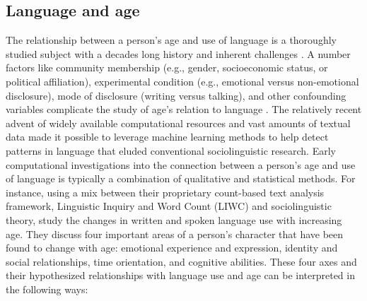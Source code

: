 \subsection{Language and age}
The relationship between a person's age and use of language is a thoroughly studied subject with a decades long history and inherent challenges \citep{pennebaker2003words, nguyen2014gender, zheng2019personalized}. A number factors like community membership (e.g., gender, socioeconomic status, or political affiliation), experimental condition (e.g., emotional versus non-emotional disclosure), mode of disclosure (writing versus talking), and other confounding variables complicate the study of age's relation to language \citep{nguyen-etal-2011-author}. The relatively recent advent of widely available computational resources and vast amounts of textual data made it possible to leverage machine learning methods to help detect patterns in language that eluded conventional sociolinguistic research. Early computational investigations into the connection between a person's age and use of language is typically a combination of qualitative and statistical methods. For instance, using a mix between their proprietary count-based text analysis framework, Linguistic Inquiry and Word Count (LIWC) and sociolinguistic theory, \cite{pennebaker2003words} study the changes in written and spoken language use with increasing age. They discuss four important areas of a person's character that have been found to change with age: emotional experience and expression, identity and social relationships, time orientation, and cognitive abilities. These four axes and their hypothesized relationships with language use and age can be interpreted in the following ways:

